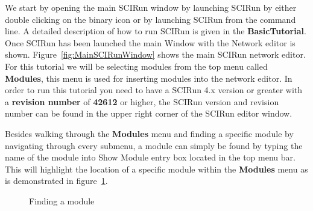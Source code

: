 \documentclass[fleqn,11pt,openany]{book}
\begin{document}
We start by opening the main SCIRun window by launching SCIRun by either double clicking on the binary icon or by launching SCIRun from the command line.
A detailed description of how to run SCIRun is given in the {\bf BasicTutorial}.
Once SCIRun has been launched the main Window with the Network editor is shown.
Figure~\ref{fig:MainSCIRunWindow} shows the main SCIRun network editor.
For this tutorial we will be selecting modules from the top menu called {\bf Modules}, this menu is used for inserting modules into the network editor.
In order to run this tutorial you need to have a SCIRun 4.x version or greater with a {\bf revision number} of {\bf 42612} or higher, the SCIRun version and revision number can be found in the upper right corner of the SCIRun editor window. 

Besides walking through the {\bf Modules} menu and finding a specific module by navigating through every submenu, a module can simply be found by typing the name of the module into Show Module entry box located in the top menu bar.
This will highlight the location of a specific module within the {\bf Modules} menu as is demonstrated in figure~\ref{fig:FindModule}. 

\begin{figure}
\caption{Finding a module}\label{fig:FindModule}
\end{figure}
\end{document}
